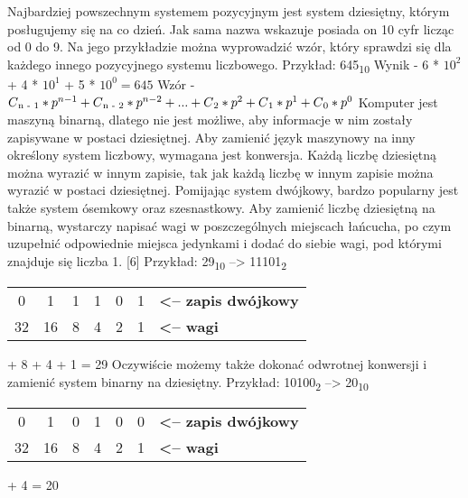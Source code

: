 \documentclass[12pt, a4paper, onside, polish]{article}				%
\begin{document}
\vspace{10mm}
Najbardziej powszechnym systemem pozycyjnym jest system dziesiętny, którym posługujemy się na co dzień. Jak sama nazwa wskazuje posiada on 10 cyfr licząc od 0 do 9. Na jego przykładzie można wyprowadzić wzór, który sprawdzi się dla każdego innego pozycyjnego systemu liczbowego.
\vspace{5mm}
\newline
Przykład: {645\textsubscript{10}}
\vspace{5mm}
\newline
Wynik - 6 * $10^{2}$ + 4 * $10^{1}$ + 5 * $10^{0} = 645$
\newline
Wzór - $C\textsubscript{n - 1} * p^{n - 1} + C\textsubscript{n - 2} * p^{n - 2} + ... + C\textsubscript{2} * p^{2} + C\textsubscript{1} * p^{1} + C\textsubscript{0} * p^{0}$
\newline\newline
Komputer jest maszyną binarną, dlatego nie jest możliwe, aby informacje w nim zostały zapisywane w postaci dziesiętnej. Aby zamienić język maszynowy na inny określony system liczbowy, wymagana jest konwersja. Każdą liczbę dziesiętną można wyrazić w innym zapisie, tak jak każdą liczbę w innym zapisie można wyrazić w postaci dziesiętnej. Pomijając system dwójkowy, bardzo popularny jest także system ósemkowy oraz szesnastkowy. Aby zamienić liczbę dziesiętną na binarną, wystarczy napisać wagi w poszczególnych miejscach łańcucha, po czym uzupełnić odpowiednie miejsca jedynkami i dodać do siebie wagi, pod którymi znajduje się liczba 1. [6]
\vspace{5mm}
\newline
Przykład: 29\textsubscript{10} -->  11101\textsubscript{2}
\begin{table}[htb]
\centering
\begin{tabular}{ccccccl}
0  & 1  & 1 & 1 & 0 & 1 & \textbf{\textless{}-- zapis dwójkowy} \\ \cline{1-6}
32 & 16 & 8 & 4 & 2 & 1 & \textbf{\textless{}-- wagi}          
\end{tabular}
\end{table}
 + 8 + 4 + 1 = 29
\newline
\newline
\newline
Oczywiście możemy także dokonać odwrotnej konwersji i zamienić system binarny na dziesiętny. 
\vspace{5mm}
\newline
Przykład: 10100\textsubscript{2} -->  20\textsubscript{10}
\begin{table}[htb]
\centering
\begin{tabular}{ccccccl}
0  & 1  & 0 & 1 & 0 & 0 & \textbf{\textless{}-- zapis dwójkowy} \\ \cline{1-6}
32 & 16 & 8 & 4 & 2 & 1 & \textbf{\textless{}-- wagi}          
\end{tabular}
\end{table}
 + 4 = 20
\newline
\end{document}

